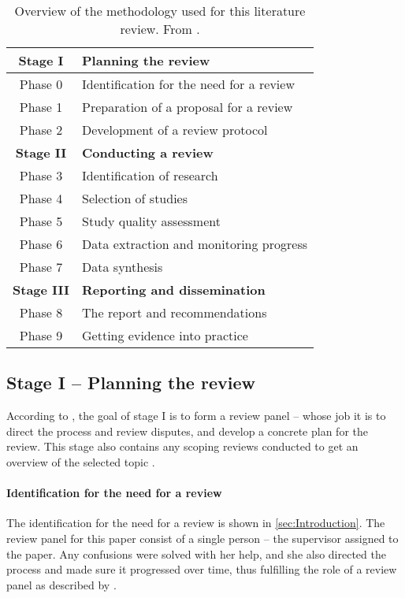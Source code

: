 \begin{table}[ht]
    \centering
    \caption[Overview of the methodology used for this literature review]{Overview of the methodology used for this literature review. From \textcite{Tranfield_2003}.}
    \label{tab:tranfield_phases}
    \begin{tabular}{cl}
        \toprule
        \textbf{Stage I} & \textbf{Planning the review} \\
        \midrule
        Phase 0 & Identification for the need for a review \\
        Phase 1 & Preparation of a proposal for a review \\
        Phase 2 & Development of a review protocol \\

        \midrule
        \textbf{Stage II} &  \textbf{Conducting a review} \\
        \midrule
        Phase 3 & Identification of research \\
        Phase 4 & Selection of studies \\
        Phase 5 & Study quality assessment \\
        Phase 6 & Data extraction and monitoring progress \\
        Phase 7 & Data synthesis \\

        \midrule
        \textbf{Stage III} & \textbf{Reporting and dissemination} \\
        \midrule
        Phase 8 & The report and recommendations \\
        Phase 9 & Getting evidence into practice \\
        \bottomrule
    \end{tabular}
\end{table}

\subsection{Stage I -- Planning the review}
According to \textcite{Tranfield_2003}, the goal of stage I is to form a review panel -- whose job it is to direct the process and review disputes, and develop a concrete plan for the review. This stage also contains any scoping reviews conducted to get an overview of the selected topic \parencite{Tranfield_2003}.

\paragraph{Identification for the need for a review}
The identification for the need for a review is shown in \autoref{sec:Introduction}. The review panel for this paper consist of a single person -- the supervisor assigned to the paper. Any confusions were solved with her help, and she also directed the process and made sure it progressed over time, thus fulfilling the role of a review panel as described by \parencite{Tranfield_2003}.

